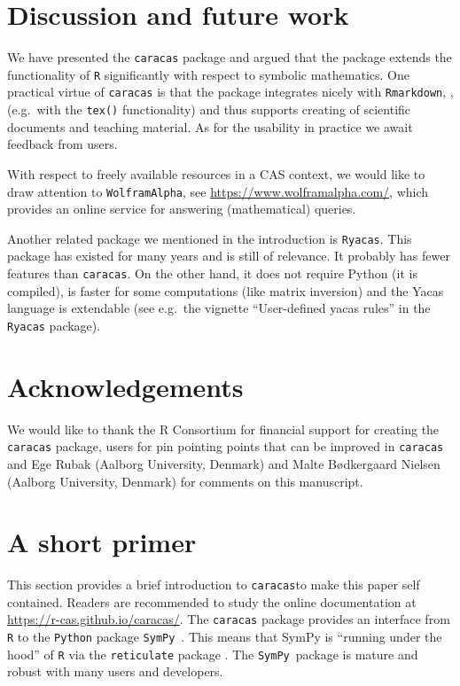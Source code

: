 \documentclass[10pt,]{article}
\begin{document}
\hypertarget{sec:discussion}{%
\section{Discussion and future work}\label{sec:discussion}}

We have presented the \texttt{caracas} package and argued that the
package extends the functionality of \texttt{R} significantly with
respect to symbolic mathematics. One practical virtue of
\texttt{caracas} is that the package integrates nicely with
\texttt{Rmarkdown}, \citet{rmarkdown}, (e.g.~with the \texttt{tex()}
functionality) and thus supports creating of scientific documents and
teaching material. As for the usability in practice we await feedback
from users.

With respect to freely available resources in a CAS context, we would
like to draw attention to \texttt{WolframAlpha}, see
\url{https://www.wolframalpha.com/}, which provides an online service
for answering (mathematical) queries.

Another related package we mentioned in the introduction is
\texttt{Ryacas}. This package has existed for many years and is still of
relevance. It probably has fewer features than \texttt{caracas}. On the
other hand, it does not require Python (it is compiled), is faster for
some computations (like matrix inversion) and the Yacas language is
extendable (see e.g.~the vignette ``User-defined yacas rules'' in the
\texttt{Ryacas} package).

\hypertarget{acknowledgements}{%
\section{Acknowledgements}\label{acknowledgements}}

We would like to thank the R Consortium for financial support for
creating the \texttt{caracas} package, users for pin pointing points
that can be improved in \texttt{caracas} and Ege Rubak (Aalborg
University, Denmark) and Malte Bødkergaard Nielsen (Aalborg University,
Denmark) for comments on this manuscript.

\tableofcontents

\appendix

\hypertarget{sec:primer}{%
\section{A short primer}\label{sec:primer}}

This section provides a brief introduction to \texttt{caracas}to make
this paper self contained. Readers are recommended to study the online
documentation at \url{https://r-cas.github.io/caracas/}. The
\texttt{caracas} package provides an interface from \texttt{R} to the
\texttt{Python} package \texttt{SymPy}~\citep{sympy}. This means that
SymPy is ``running under the hood'' of \texttt{R} via the
\texttt{reticulate} package \citep{reticulate}. The
\texttt{SymPy}~package is mature and robust with many users and
developers.
\end{document}
